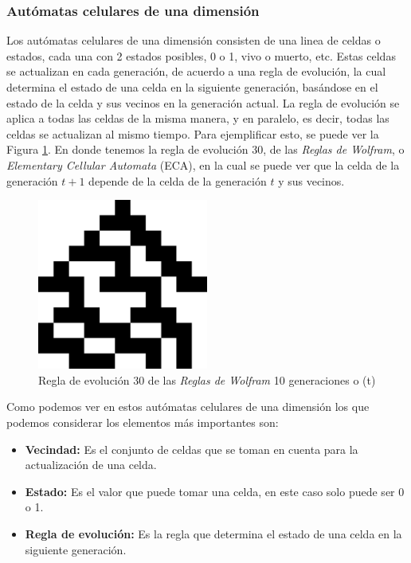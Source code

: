 \subsubsection{Aut\'omatas celulares de una dimensi\'on}
\label{sec:AutomatasCel1D}
    Los aut\'omatas celulares de una dimensi\'on consisten de una linea de celdas o estados, cada una con 2 estados posibles, 
        0 o 1, vivo o muerto, etc. Estas celdas se actualizan en cada generaci\'on, de acuerdo a una regla de evoluci\'on, 
        la cual determina el estado de una celda en la siguiente generaci\'on, bas\'andose en el estado de la celda y sus 
        vecinos en la generaci\'on actual. La regla de evoluci\'on se aplica a todas las celdas de la misma manera, y en 
        paralelo, es decir, todas las celdas se actualizan al mismo tiempo. Para ejemplificar esto, se puede ver la Figura
        \ref{fig:automataCelular1D}. En donde tenemos la regla de evoluci\'on 30, de las \textit{Reglas de Wolfram}\cite{Wolfram1959}, o
        \textit{Elementary Cellular Automata} (ECA), en la cual se puede ver que la celda de la generaci\'on $t+1$ depende
        de la celda de la generaci\'on $t$ y sus vecinos.
        \begin{figure}[h!]
            \centering
            \includegraphics[width=0.5\textwidth]{./images/marco_teorico/automatas_celulares/Regla30.png}
            \caption{Regla de evoluci\'on 30 de las \textit{Reglas de Wolfram} 10 generaciones o (t)}
            \label{fig:automataCelular1D}
        \end{figure}
    \vskip 0.5cm
    Como podemos ver en estos aut\'omatas celulares de una dimensi\'on los que podemos considerar los elementos m\'as importantes son:
        \begin{itemize}
            \item \textbf{Vecindad:} Es el conjunto de celdas que se toman en cuenta para la actualizaci\'on de una celda.
            \item \textbf{Estado:} Es el valor que puede tomar una celda, en este caso solo puede ser 0 o 1.
            \item \textbf{Regla de evoluci\'on:} Es la regla que determina el estado de una celda en la siguiente generaci\'on.
        \end{itemize}
